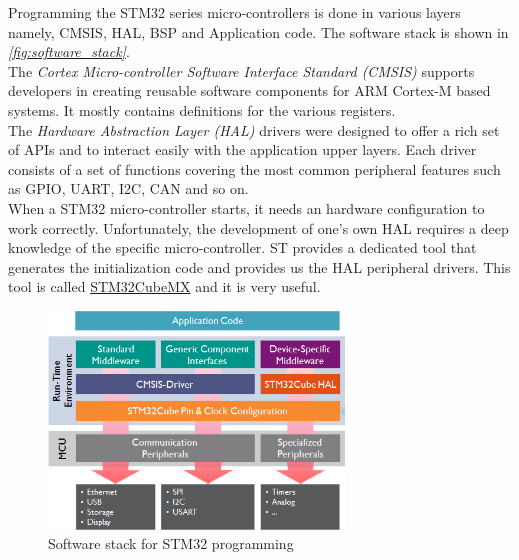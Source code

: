 \documentclass[a4paper,12pt,oneside]{book}
\begin{document}
Programming the STM32 series micro-controllers is done in various layers namely, CMSIS, HAL, BSP and Application code. The software stack is shown in \textit{\autoref{fig:software_stack}}.\\

The \textit{Cortex Micro-controller Software Interface Standard (CMSIS)} supports developers in creating reusable software components for ARM Cortex-M based systems. It mostly contains definitions for the various registers.\\

The \textit{Hardware Abstraction Layer (HAL)} drivers were designed to offer a rich set of APIs and to interact easily with the application upper layers. Each driver consists of a set of functions covering the most common peripheral features such as GPIO, UART, I2C, CAN and so on.\cite{stm32hal}\\

When a STM32 micro-controller starts, it needs an hardware configuration to work correctly. Unfortunately, the development of one's own HAL requires a deep knowledge of the specific micro-controller. ST provides a dedicated tool that generates the initialization code and provides us the HAL peripheral drivers. This tool is called \href{http://www.st.com/en/development-tools/stm32cubemx.html}{STM32CubeMX} and it is very useful.\cite{carmine}\\

\begin{figure}[!htb]
\centering
\includegraphics[width=0.7\textwidth]{images/software_stack}
\caption{Software stack for STM32 programming}
\label{fig:software_stack}
\end{figure}
\end{document}
